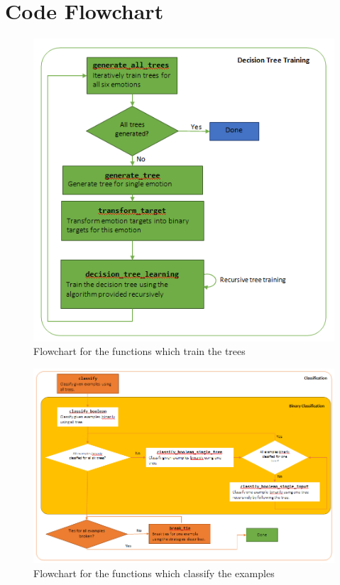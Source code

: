 \documentclass[a4paper]{article}
\begin{document}
\clearpage


\section{Code Flowchart}

\begin{figure}[H]
\center
\includegraphics[width=0.6\columnwidth]{flowchartBuildTree}
\caption{Flowchart for the functions which train the trees}
\label{flowchartBuildTree}
\end{figure}

\begin{figure}[H]
\center
\includegraphics[width=0.9\columnwidth]{flowchartClassify}
\caption{Flowchart for the functions which classify the examples}
\label{flowchartClassify}
\end{figure}

\clearpage

\end{document}
